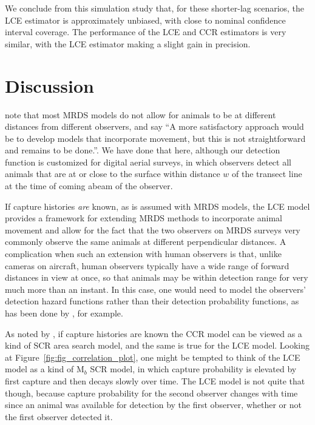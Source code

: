 \documentclass[useAMS, usenatbib, referee]{biom}\usepackage[]{graphicx}\usepackage[]{color}
\begin{document}
We conclude from this simulation study that, for these shorter-lag scenarios, the LCE estimator is approximately unbiased, with close to nominal confidence interval coverage. The performance of the LCE and CCR estimators is very similar, with the LCE estimator making a slight gain in precision.


\section{Discussion\label{sec:discussion}}


\cite{Burt+al:14} note that most MRDS models do not allow for animals to be at different distances from different observers, and say ``A more satisfactory approach would be to develop models that incorporate movement, but this is not straightforward and remains to be done.''. We have done that here, although our detection function is customized for digital aerial surveys, in which observers detect all animals that are at or close to the surface within distance $w$ of the transect line at the time of coming abeam of the observer.

If capture histories \textit{are} known, as is assumed with MRDS models, the LCE model provides a framework for extending MRDS methods to incorporate animal movement and allow for the fact that the two observers on MRDS surveys very commonly observe the same animals at different perpendicular distances. A complication when such an extension with human observers is that, unlike cameras on aircraft, human observers typically have a wide range of forward distances in view at once, so that animals may be within detection range for very much more than an instant. In this case, one would need to model the observers' detection hazard functions rather than their detection probability functions, as has been done by \cite{Langrock+al:13, Borchers+al:13, Borchers+Langrock:15, Borchers+Cox:16}, for example.

As noted by \cite{Stevenson+al:18}, if capture histories are known the CCR model can be viewed as a kind of SCR area search model, and the same is true for the LCE model. Looking at Figure~\ref{fig:fig_correlation_plot}, one might be tempted to think of the LCE model as a kind of M$_b$ SCR model, in which capture probability is elevated by first capture and then decays slowly over time. The LCE model is not quite that though, because capture probability for the second observer changes with time since an animal was available for detection by the first observer, whether or not the first observer detected it.
\end{document}
